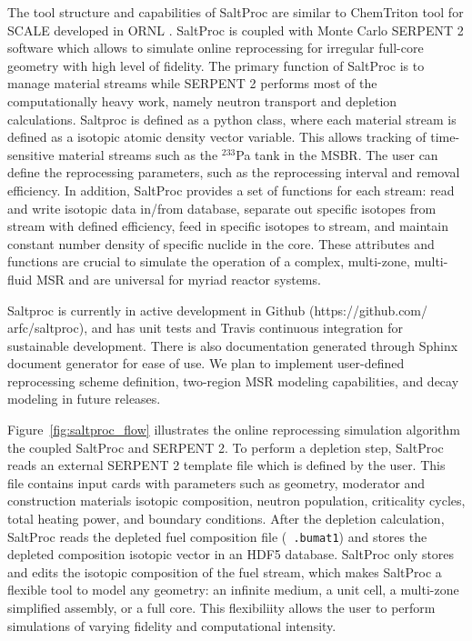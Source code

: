 The tool structure and capabilities of SaltProc are similar to ChemTriton tool for SCALE
developed in \gls{ORNL} \cite{powers_new_2013}. SaltProc is coupled with Monte Carlo SERPENT 2
software which allows to simulate online reprocessing for irregular full-core geometry with 
high level of fidelity.  The primary function of SaltProc is to manage material streams while
SERPENT 2 performs most of the computationally heavy work, namely neutron transport and depletion
calculations. Saltproc is defined as a 
python class, where each material stream is defined as a isotopic atomic density
vector variable. This allows tracking of time-sensitive material streams such as the
$^{233}$Pa tank in the \gls{MSBR}. The user can define the reprocessing parameters, such as the 
reprocessing interval and removal efficiency.  In addition, SaltProc provides a set of functions 
for each stream: read and write isotopic data in/from database, separate out specific isotopes 
from stream with defined efficiency, feed in specific isotopes to stream, and maintain constant 
number density of specific nuclide in the core. These attributes and functions are crucial to 
simulate the operation of a complex, multi-zone, multi-fluid \gls{MSR} and are universal for 
myriad reactor systems.

Saltproc is currently in active development in Github (https://github.com/ arfc/saltproc), and has unit tests and Travis continuous integration for sustainable development. There is also documentation
generated through Sphinx document generator for ease of use. We plan to implement
user-defined reprocessing scheme definition, two-region \gls{MSR} modeling capabilities,
and decay modeling in future releases.

Figure~\ref{fig:saltproc_flow} illustrates the  online reprocessing simulation algorithm the 
coupled SaltProc and SERPENT 2. To perform a depletion step,
SaltProc reads an external SERPENT 2 template file which is defined by the user. This file 
contains input cards with parameters such as geometry,
moderator and construction materials isotopic composition, neutron population, criticality 
cycles, total heating power, and boundary conditions.
After the depletion calculation, SaltProc reads the depleted fuel composition file (\texttt{
.bumat1}) and stores the depleted
composition isotopic vector in an HDF5 database. SaltProc only stores and edits the isotopic 
composition of the fuel stream,
which makes SaltProc a flexible tool to model any geometry: an infinite medium, a unit cell, a 
multi-zone simplified assembly, or a full core.
This flexibiliity allows the user to perform simulations of varying fidelity and computational 
intensity.

